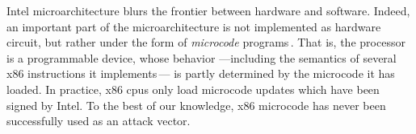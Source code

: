 %
%

Intel microarchitecture blurs the frontier between hardware and software.
%
Indeed, an important part of the microarchitecture is not implemented as
hardware circuit, but rather under the form of \emph{microcode}
programs\,\cite[Section 2.14]{costan2016sgxexplained}.
%
That is, the processor is a programmable device, whose behavior ---including the
semantics of several x86 instructions it
implements\,\cite{johnson2015patentsgx}--- is partly determined by the microcode
it has loaded.
%
In practice, x86 \acp{cpu} only load microcode updates which have been signed by
Intel.
%
To the best of our knowledge, x86 microcode has never been successfully used as
an attack vector.

